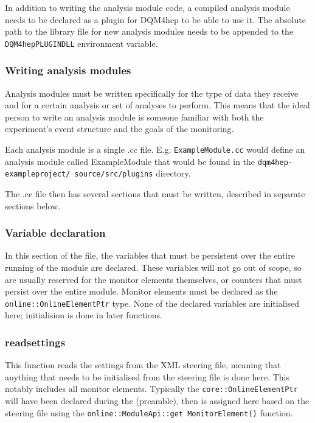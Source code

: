 In addition to writing the analysis module code, a compiled analysis module needs to be declared as a plugin for \acrshort{DQM4hep} to be able to use it. The absolute path to the library file for new analysis modules needs to be appended to the \texttt{DQM4hep\textunderscore PLUGIN\textunderscore DLL} environment variable. 

\subsubsection{Writing analysis modules}
Analysis modules must be written specifically for the type of data they receive and for a certain analysis or set of analyses to perform. This means that the ideal person to write an analysis module is someone familiar with both the experiment's event structure and the goals of the monitoring.

Each analysis module is a single .cc file. E.g. \texttt{ExampleModule.cc} would define an analysis module called ExampleModule that would be found in the \texttt{dqm4hep-exampleproject/ source/src/plugins} directory.

The .cc file then has several sections that must be written, described in separate sections below.

\subsubsection{Variable declaration}
In this section of the file, the variables that must be persistent over the entire running of the module are declared. These variables will not go out of scope, so are usually reserved for the monitor elements themselves, or counters that must persist over the entire module. Monitor elements must be declared as the \texttt{online::OnlineElementPtr} type. None of the declared variables are initialised here; initialision is done in later functions.

\subsubsection{readsettings}
This function reads the settings from the XML steering file, meaning that anything that needs to be initialised from the steering file is done here. This notably includes all monitor elements. Typically the \texttt{core::OnlineElementPtr} will have been declared during the (preamble), then is assigned here based on the steering file using the \texttt{online::ModuleApi::get MonitorElement()} function. 


